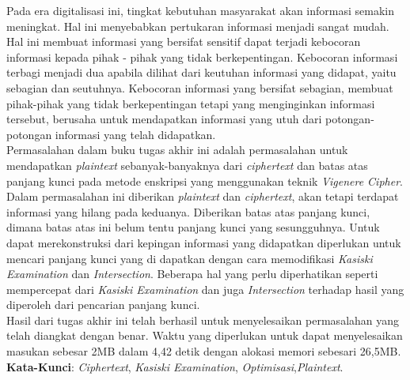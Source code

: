 \begin{abstrak}
		\indent Pada era digitalisasi ini, tingkat kebutuhan masyarakat akan informasi semakin meningkat. Hal ini menyebabkan pertukaran informasi menjadi sangat mudah. Hal ini membuat informasi yang bersifat sensitif dapat terjadi kebocoran informasi kepada pihak - pihak yang tidak berkepentingan. Kebocoran informasi terbagi menjadi dua apabila dilihat dari keutuhan informasi yang didapat, yaitu sebagian dan seutuhnya. Kebocoran informasi yang bersifat sebagian, membuat pihak-pihak yang tidak berkepentingan tetapi yang menginginkan informasi tersebut, berusaha untuk mendapatkan informasi yang utuh dari potongan-potongan informasi yang telah didapatkan. 
\\
\indent Permasalahan dalam buku tugas akhir ini adalah permasalahan untuk mendapatkan \textit{plaintext} sebanyak-banyaknya dari \textit{ciphertext} dan batas atas panjang kunci pada metode enskripsi yang menggunakan teknik \textit{Vigenere Cipher}. Dalam permasalahan ini diberikan \textit{plaintext} dan \textit{ciphertext}, akan tetapi terdapat informasi yang hilang pada keduanya. Diberikan batas atas panjang kunci, dimana batas atas ini belum tentu panjang kunci yang sesungguhnya. Untuk dapat merekonstruksi \plaintext dari kepingan informasi yang didapatkan diperlukan untuk mencari panjang kunci yang di dapatkan dengan cara memodifikasi \textit{Kasiski Examination} dan \textit{Intersection}. Beberapa hal yang perlu diperhatikan seperti mempercepat dari \textit{Kasiski Examination} dan juga \textit{Intersection} terhadap hasil yang diperoleh dari pencarian panjang kunci.
\\  
\indent Hasil dari tugas akhir ini telah berhasil untuk menyelesaikan permasalahan yang telah diangkat dengan benar. Waktu yang diperlukan untuk dapat menyelesaikan masukan sebesar 2MB dalam 4,42 detik dengan alokasi memori sebesari 26,5MB.
\\
\noindent \textbf{Kata-Kunci}:  \textit{Ciphertext}, \textit{Kasiski Examination}, \textit{Optimisasi},\textit{Plaintext}.
\end{abstrak}


